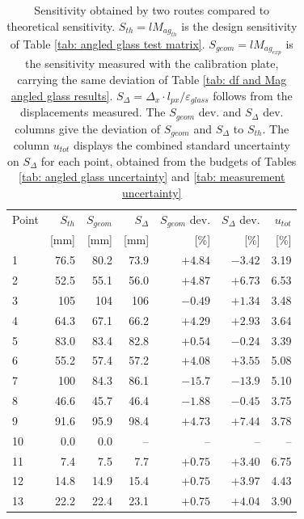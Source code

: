 \begin{table}[htbp]
    \centering
    \caption[Sensitivity obtained by two routes against theory]{Sensitivity obtained by two routes compared to theoretical sensitivity. $S_{th} = l M_{ag_{th}}$ is the design sensitivity of Table \ref{tab: angled glass test matrix}. $S_{geom} = l M_{ag_{exp}}$ is the sensitivity measured with the calibration plate, carrying the same deviation of Table \ref{tab: df and Mag angled glass results}. $S_{\Delta} = \Delta_x \cdot l_{px} / \varepsilon_{glass}$ follows from the displacements measured. The $S_{geom}$ dev. and $S_{\Delta}$ dev. columns give the deviation of $S_{geom}$ and $S_{\Delta}$ to $S_{th}$. The column $u_{tot}$ displays the combined standard uncertainty on $S_{\Delta}$ for each point, obtained from the budgets of Tables \ref{tab: angled glass uncertainty} and \ref{tab: measurement uncertainty}}
    \label{tab: sensitivity comparison}
    \begin{tabular}{lrrrrrr}
        \toprule
        Point & $S_{th}$ & $S_{geom}$ & $S_{\Delta}$ & $S_{geom}$ dev. & $S_{\Delta}$ dev. & $u_{tot}$ \\
              & [mm] & [mm] & [mm] & [\%] & [\%] & [\%] \\
        \midrule
         1 &  76.5 &  80.2 &  73.9 &  $+4.84$ &  $-3.42$ &  3.19 \\
         2 &  52.5 &  55.1 &  56.0 &  $+4.87$ &  $+6.73$ &  6.53 \\
         3 & 105 & 104 & 106 &  $-0.49$ &  $+1.34$ &  3.48 \\
         4 &  64.3 &  67.1 &  66.2 &  $+4.29$ &  $+2.93$ &  3.64 \\
         5 &  83.0 &  83.4 &  82.8 &  $+0.54$ &  $-0.24$ &  3.39 \\
         6 &  55.2 &  57.4 &  57.2 &  $+4.08$ &  $+3.55$ &  5.08 \\
         7 & 100 &  84.3 &  86.1 & $-15.7$ & $-13.9$ &  5.10 \\
         8 &  46.6 &  45.7 &  46.4 &  $-1.88$ &  $-0.45$ &  3.75 \\
         9 &  91.6 &  95.9 &  98.4 &  $+4.73$ &  $+7.44$ &  3.78 \\
        \midrule
        10 &   0.0 &   0.0 &  --   &  --   &  -- &    -- \\
        11 &   7.4 &   7.5 &   7.7 &  $+0.75$ &  $+3.40$ &  6.75 \\
        12 &  14.8 &  14.9 &  15.4 &  $+0.75$ &  $+3.97$ &  4.43 \\
        13 &  22.2 &  22.4 &  23.1 &  $+0.75$ &  $+4.04$ &  3.90 \\

\end{tabular}
\end{table}
